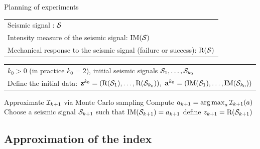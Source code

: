 \begin{algorithm*}
		\caption{Planning of experiments}
		\begin{algorithmic}
            \REQUIRE \begin{tabular}[t]{l}
			Seismic signal : $\mathcal{S}$\\ Intensity measure of the seismic signal: $\mathrm{IM}(\mathcal{S})$\\ Mechanical response to the seismic signal (failure or success): $\mathrm R(\mathcal{S})$ 
			\end{tabular}\renewcommand{\algorithmicrequire}{\textbf{Initialization:}}
            \REQUIRE \begin{tabular}[t]{l}
			$k_0>0$ (in practice $k_0=2$), initial seismic signals $\mathcal{S}_1,\dots,\mathcal{S}_{k_0}$\\
            Define the initial data: $\mathbf{z}^{k_0}=(\mathrm{R}(\mathcal{S}_1),\dots,\mathrm{R}(\mathcal{S}_{k_0})),\   \mathbf{a}^{k_0}=(\mathrm{IM}(\mathcal{S}_1),\dots,\mathrm{IM}(\mathcal{S}_{k_0}))$
			\end{tabular}
	            \STATE Approximate $\mathcal{I}_{k+1}$ via Monte Carlo sampling
                \STATE Compute $a_{k+1}=\operatorname*{arg\,max}_a\mathcal{I}_{k+1}(a)$
	            \STATE Choose a seismic signal $\mathcal{S}_{k+1}$ such that $\mathrm{IM}(\mathcal{S}_{k+1})=a_{k+1}$
                 define $z_{k+1}=\mathrm{R}(\mathcal{S}_{k+1})$
	        \ENDFOR
		\end{algorithmic}
	    \label{alg:doe:PE}
	\end{algorithm*}


\subsection{Approximation of the index}

